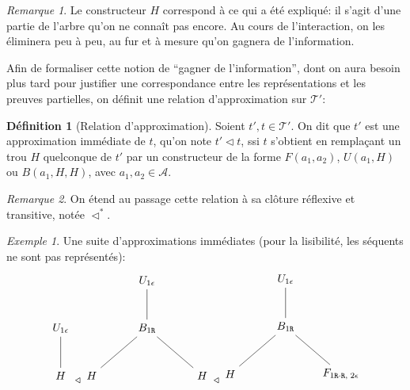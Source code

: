 \documentclass[11pt,a4paper]{article}
\theoremstyle{plain}
\theoremstyle{definition}
\newtheorem{definition}{Définition}
\theoremstyle{remark}
\newtheorem{remark}{Remarque}
\newtheorem{example}{Exemple}
\newcommand*{\Right}{\textnormal{\texttt{R}}}
\newcommand*{\addresses}{\ensuremath{\mathcal{A}}}
\newcommand*{\treespartial}{\ensuremath{\mathcal{T'}}}
\newcommand*{\relapprox}{\ensuremath{\triangleleft}}
\newcommand*{\relapproxlarge}{\ensuremath{\relapprox^*}}
\newcommand*{\unknown}{H}
\begin{document}
\begin{remark}
    Le constructeur $\unknown$ correspond à ce qui a été expliqué: il s'agit d'une partie de l'arbre qu'on ne connaît pas encore. Au cours de l'interaction, on les éliminera peu à peu, au fur et à mesure qu'on gagnera de l'information.
\end{remark}

Afin de formaliser cette notion de ``gagner de l'information'', dont on aura besoin plus tard pour justifier une correspondance entre les représentations et les preuves partielles, on définit une relation d'approximation sur \treespartial{}:

\begin{definition}[Relation d'approximation]
    Soient $t', t \in \treespartial$. On dit que $t'$ est une approximation immédiate de $t$, qu'on note $t' \relapprox t$, ssi $t$ s'obtient en remplaçant un trou $\unknown$ quelconque de $t'$ par un constructeur de la forme $F(a_1, a_2)$, $U(a_1, \unknown)$ ou $B(a_1, \unknown, \unknown)$, avec $a_1, a_2 \in \addresses$.
\end{definition}

\begin{remark}
    On étend au passage cette relation à sa clôture réflexive et transitive, notée $\relapproxlarge$.
\end{remark}

\begin{example}
Une suite d'approximations immédiates (pour la lisibilité, les séquents ne sont pas représentés):
    \begin{equation*}
    \begin{tikzpicture}%
        [level distance=1.5cm,
        level 2/.style={sibling distance=3.5cm}]
        \node {$U_{1 \epsilon}$}
        child {node {$\unknown$}};
    \end{tikzpicture}
    \relapprox
    \begin{tikzpicture}%
        [level distance=1.5cm,
        level 2/.style={sibling distance=3.5cm}]
        \node {$U_{1 \epsilon}$}
        child {node {$B_{1 \Right}$}
            child {node {$\unknown$}}
            child {node {$\unknown$}}
        };
    \end{tikzpicture}
    \relapprox
    \begin{tikzpicture}%
        [level distance=1.5cm,
        level 2/.style={sibling distance=3.5cm}]
        \node {$U_{1 \epsilon}$}
        child {node {$B_{1 \Right}$}
            child {node {$\unknown$}}
            child {node {$F_{1 \Right \cdot \Right, \; 2 \epsilon}$}}
        };
    \end{tikzpicture}
    \end{equation*}
\end{example}
\end{document}
